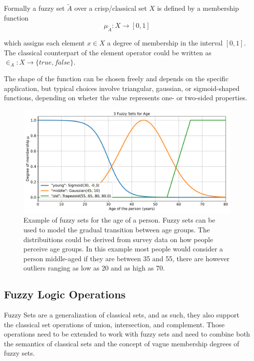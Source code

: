 Formally a fuzzy set $\tilde{A}$ over a crisp/classical set $X$ is defined by a membership function
\begin{equation}
      \mu_{\tilde{A}}: X \rightarrow [0, 1]
\end{equation}

which assigns each element $x \in X$ a degree of membership in the interval $[0, 1]$. The classical counterpart of the element operator could be written as $\in_A: X \rightarrow \{true, false\}$.

The shape of the function can be chosen freely and depends on the specific application, but typical choices involve triangular, gaussian, or sigmoid-shaped functions, depending on wheter the value represents one- or two-sided properties.


\begin{figure}[H]
      \centering
      \includegraphics[width=0.8\columnwidth,trim={0 0 0 1cm},clip]{figures/Intro/age-fuzzy-sets.png}
      \caption{Example of fuzzy sets for the age of a person. Fuzzy sets can be used to model the gradual transition between age groups. The distribuitions could be derived from survey data on how people perceive age groups. In this example most people would consider a person middle-aged if they are between 35 and 55, there are however outliers ranging as low as 20 and as high as 70.}
      \label{fig:fuzzy_sets}
\end{figure}

\subsection{Fuzzy Logic Operations}

Fuzzy Sets are a generalization of classical sets, and as such, they also support the classical set operations of union, intersection, and complement. Those operations need to be extended to work with fuzzy sets and need to combine both the semantics of classical sets and the concept of vague membership degrees of fuzzy sets.

